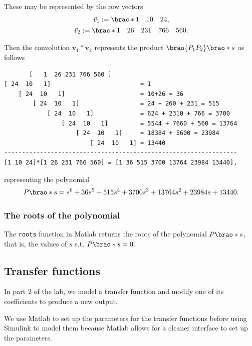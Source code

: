 \documentclass[12pt]{article}
\DeclarePairedDelimiter\brao()%
\DeclarePairedDelimiter\brac[]%
\begin{document}
These may be represented by the row vectors
\[
    \begin{gathered}
        \vec{v}_1 := \brac*{\begin{matrix} 1 & 10 & 24 \\* \end{matrix}}\rlap, \\*
        \vec{v}_2 := \brac*{\begin{matrix} 1 & 26 & 231 & 766 & 560 \\* \end{matrix}}\rlap. \\*
    \end{gathered}
\]

\pagebreak

Then the convolution $\mathbf{v}_1 \ast \mathbf{v}_2$ represents the product $\brao{P_1 P_2}\brao*s$ as follows

\begin{verbatim}
       [   1  26 231 766 560 ]
[ 24  10   1]                         = 1
    [ 24  10   1]                     = 10+26 = 36
        [ 24  10   1]                 = 24 + 260 + 231 = 515
            [ 24  10   1]             = 624 + 2310 + 766 = 3700
                [ 24  10   1]         = 5544 + 7660 + 560 = 13764
                    [ 24  10   1]     = 18384 + 5600 = 23984
                        [ 24  10   1] = 13440
-----------------------------------------------------------------
[1 10 24]*[1 26 231 766 560] = [1 36 515 3700 13764 23984 13440],
\end{verbatim}

representing the polynomial
\[
    P\brao*s = s^6 + 36s^5 + 515s^4 + 3700s^3 + 13764s^2 + 23984s + 13440\rlap.
\]

\subsubsection{The roots of the polynomial}

The \texttt{roots} function in Matlab returns the roots of the polynomial $P\brao*s$, that is, the values of $s$ s.t. $P\brao*s = 0$.

\subsection{Transfer functions}

In part 2 of the lab, we model a transfer function and modify one of its coefficients to produce a new output.

We use Matlab to set up the parameters for the transfer functions before using Simulink to model them because Matlab allows for a cleaner interface to set up the parameters.
\end{document}
